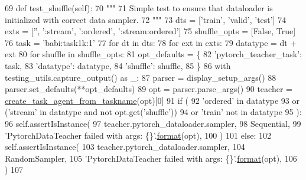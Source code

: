 \begin{DoxyCode}
69     \textcolor{keyword}{def }test\_shuffle(self):
70         \textcolor{stringliteral}{"""}
71 \textcolor{stringliteral}{        Simple test to ensure that dataloader is initialized with correct data sampler.}
72 \textcolor{stringliteral}{        """}
73         dts = [\textcolor{stringliteral}{'train'}, \textcolor{stringliteral}{'valid'}, \textcolor{stringliteral}{'test'}]
74         exts = [\textcolor{stringliteral}{''}, \textcolor{stringliteral}{':stream'}, \textcolor{stringliteral}{':ordered'}, \textcolor{stringliteral}{':stream:ordered'}]
75         shuffle\_opts = [\textcolor{keyword}{False}, \textcolor{keyword}{True}]
76         task = \textcolor{stringliteral}{'babi:task1k:1'}
77         \textcolor{keywordflow}{for} dt \textcolor{keywordflow}{in} dts:
78             \textcolor{keywordflow}{for} ext \textcolor{keywordflow}{in} exts:
79                 datatype = dt + ext
80                 \textcolor{keywordflow}{for} shuffle \textcolor{keywordflow}{in} shuffle\_opts:
81                     opt\_defaults = \{
82                         \textcolor{stringliteral}{'pytorch\_teacher\_task'}: task,
83                         \textcolor{stringliteral}{'datatype'}: datatype,
84                         \textcolor{stringliteral}{'shuffle'}: shuffle,
85                     \}
86                     with testing\_utils.capture\_output() \textcolor{keyword}{as} \_:
87                         parser = display\_setup\_args()
88                         parser.set\_defaults(**opt\_defaults)
89                         opt = parser.parse\_args()
90                         teacher = \hyperlink{namespaceparlai_1_1core_1_1agents_ab4473fa54af02b5ab385b41b51dacd10}{create\_task\_agent\_from\_taskname}(opt)[0]
91                         \textcolor{keywordflow}{if} (
92                             \textcolor{stringliteral}{'ordered'} \textcolor{keywordflow}{in} datatype
93                             \textcolor{keywordflow}{or} (\textcolor{stringliteral}{'stream'} \textcolor{keywordflow}{in} datatype \textcolor{keywordflow}{and} \textcolor{keywordflow}{not} opt.get(\textcolor{stringliteral}{'shuffle'}))
94                             \textcolor{keywordflow}{or} \textcolor{stringliteral}{'train'} \textcolor{keywordflow}{not} \textcolor{keywordflow}{in} datatype
95                         ):
96                             self.assertIsInstance(
97                                 teacher.pytorch\_dataloader.sampler,
98                                 Sequential,
99                                 \textcolor{stringliteral}{'PytorchDataTeacher failed with args: \{\}'}.\hyperlink{namespaceparlai_1_1chat__service_1_1services_1_1messenger_1_1shared__utils_a32e2e2022b824fbaf80c747160b52a76}{format}(opt),
100                             )
101                         \textcolor{keywordflow}{else}:
102                             self.assertIsInstance(
103                                 teacher.pytorch\_dataloader.sampler,
104                                 RandomSampler,
105                                 \textcolor{stringliteral}{'PytorchDataTeacher failed with args: \{\}'}.\hyperlink{namespaceparlai_1_1chat__service_1_1services_1_1messenger_1_1shared__utils_a32e2e2022b824fbaf80c747160b52a76}{format}(opt),
106                             )
107 
\end{DoxyCode}
